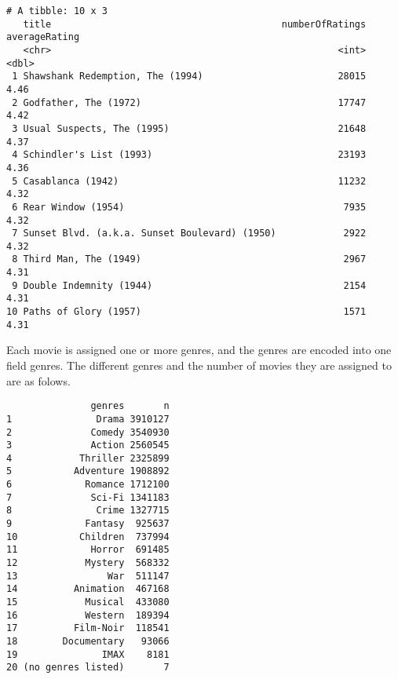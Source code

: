 \documentclass[
]{article}
\newenvironment{Shaded}{\begin{snugshade}}{\end{snugshade}}
\newcommand{\CharTok}[1]{\textcolor[rgb]{0.02,0.61,0.04}{#1}}
\newcommand{\CommentTok}[1]{\textcolor[rgb]{0.00,0.40,1.00}{\textbf{\textit{#1}}}}
\newcommand{\DataTypeTok}[1]{\textcolor[rgb]{0.74,0.68,0.62}{\underline{#1}}}
\newcommand{\KeywordTok}[1]{\textcolor[rgb]{0.26,0.66,0.93}{\textbf{#1}}}
\newcommand{\NormalTok}[1]{\textcolor[rgb]{0.74,0.68,0.62}{#1}}
\newcommand{\OperatorTok}[1]{\textcolor[rgb]{0.74,0.68,0.62}{#1}}
\newcommand{\StringTok}[1]{\textcolor[rgb]{0.02,0.61,0.04}{#1}}
\begin{document}
\begin{verbatim}
# A tibble: 10 x 3
   title                                         numberOfRatings averageRating
   <chr>                                                   <int>         <dbl>
 1 Shawshank Redemption, The (1994)                        28015          4.46
 2 Godfather, The (1972)                                   17747          4.42
 3 Usual Suspects, The (1995)                              21648          4.37
 4 Schindler's List (1993)                                 23193          4.36
 5 Casablanca (1942)                                       11232          4.32
 6 Rear Window (1954)                                       7935          4.32
 7 Sunset Blvd. (a.k.a. Sunset Boulevard) (1950)            2922          4.32
 8 Third Man, The (1949)                                    2967          4.31
 9 Double Indemnity (1944)                                  2154          4.31
10 Paths of Glory (1957)                                    1571          4.31
\end{verbatim}

Each movie is assigned one or more genres, and the genres are encoded
into one field genres. The different genres and the number of movies
they are assigned to are as folows.

\begin{Shaded}
\end{Shaded}

\begin{verbatim}
               genres       n
1               Drama 3910127
2              Comedy 3540930
3              Action 2560545
4            Thriller 2325899
5           Adventure 1908892
6             Romance 1712100
7              Sci-Fi 1341183
8               Crime 1327715
9             Fantasy  925637
10           Children  737994
11             Horror  691485
12            Mystery  568332
13                War  511147
14          Animation  467168
15            Musical  433080
16            Western  189394
17          Film-Noir  118541
18        Documentary   93066
19               IMAX    8181
20 (no genres listed)       7
\end{verbatim}
\end{document}
